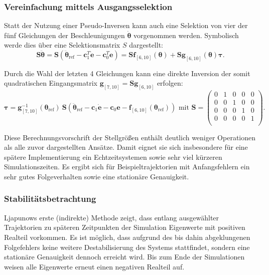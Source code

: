 \subsubsection{Vereinfachung mittels Ausgangsselektion}
Statt der Nutzung einer Pseudo-Inversen kann auch eine Selektion von vier der fünf Gleichungen der Beschleunigungen $\dot{\pmb{\theta}}$ vorgenommen werden. Symbolisch werde dies über eine Selektionsmatrix $S$ dargestellt:
\begin{equation}
	\pmb{S} \ddot{\pmb{\theta}} = \pmb{S}(\ddot{\pmb{\theta}}_{\text{ref}} - \pmb{c}_1^T \dot{\pmb{e}} - \pmb{c}_0^T \pmb{e}) = \pmb{S} \pmb{f}_{[6, 10]}(\pmb{\theta}) + \pmb{S} \pmb{g}_{[6, 10]}(\pmb{\theta}) \pmb{\tau}.
\end{equation} 

Durch die Wahl der letzten 4 Gleichungen kann eine direkte Inversion der somit quadratischen Eingangsmatrix $\pmb{g}_{[7, 10]} = \pmb{S} \pmb{g}_{[6, 10]}$ erfolgen:
\begin{equation}
	\pmb{\tau}= \pmb{g}^{-1}_{[7, 10]}(\pmb{\theta}_{\text{ref}}) \ \pmb{S}(\ddot{\pmb{\theta}}_{\text{ref}} - \pmb{c}_{1} \pmb{\dot{e}} - \pmb{c}_{0} \pmb{e} - \pmb{f}_{[6, 10]}(\pmb{\theta}_{\text{ref}})) \text{ mit } 
	\pmb{S} = 
	\begin{pmatrix}
	0 & 1 & 0 & 0 & 0 \\
	0 & 0 & 1 & 0 & 0 \\
	0 & 0 & 0 & 1 & 0 \\
	0 & 0 & 0 & 0 & 1 \\
	\end{pmatrix}.
\end{equation}

Diese Berechnungsvorschrift der Stellgrößen enthält deutlich weniger Operationen als alle zuvor dargestellten Ansätze. Damit eignet sie sich insbesondere für eine spätere Implementierung ein Echtzeitsystemen sowie sehr viel kürzeren Simulationszeiten. Es ergibt sich für Beispieltrajektorien mit Anfangsfehlern ein sehr gutes Folgeverhalten sowie eine stationäre Genauigkeit.

\subsubsection{Stabilitätsbetrachtung}
Ljapunows erste (indirekte) Methode zeigt, dass entlang ausgewählter Trajektorien zu späteren Zeitpunkten der Simulation Eigenwerte mit positiven Realteil vorkommen. Es ist möglich, dass aufgrund des bis dahin abgeklungenen Folgefehlers keine weitere Destabilisierung des Systems stattfindet, sondern eine stationäre Genauigkeit dennoch erreicht wird. Bis zum Ende der Simulationen weisen alle Eigenwerte erneut einen negativen Realteil auf.

